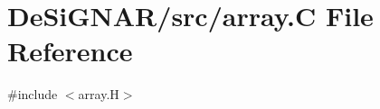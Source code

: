 \hypertarget{array_8_c}{}\section{De\+Si\+G\+N\+A\+R/src/array.C File Reference}
\label{array_8_c}
{\ttfamily \#include $<$array.\+H$>$}\newline
